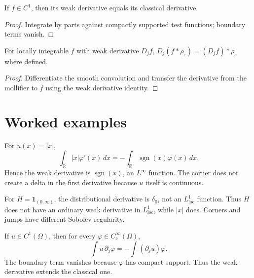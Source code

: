 \begin{theorem}\label{thm:iii20-02}
If $f\in C^1$, then its weak derivative equals its classical derivative.
\begin{proof}
Integrate by parts against compactly supported test functions; boundary terms vanish.
\end{proof}
\end{theorem}

\begin{theorem}\label{thm:iii20-03}
For locally integrable $f$ with weak derivative $D_jf$, $D_j(f*\rho_\varepsilon)=(D_jf)*\rho_\varepsilon$ where defined.
\begin{proof}
Differentiate the smooth convolution and transfer the derivative from the mollifier to $f$ using the weak derivative identity.
\end{proof}
\end{theorem}

\section{Worked examples}

\begin{example}\label{ex:iii20-worked-01}
For \(u(x)=|x|\),
\[
\int_{\mathbb R}|x|\varphi'(x)\,dx
=-\int_{\mathbb R}\operatorname{sgn}(x)\varphi(x)\,dx.
\]
Hence the weak derivative is \(\operatorname{sgn}(x)\), an \(L^\infty\)
function. The corner does not create a delta in the first derivative because
\(u\) itself is continuous.
\end{example}

\begin{example}\label{ex:iii20-worked-02}
For \(H=\mathbf1_{(0,\infty)}\), the distributional derivative is
\(\delta_0\), not an \(L^1_{\mathrm{loc}}\) function. Thus \(H\) does not have
an ordinary weak derivative in \(L^1_{\mathrm{loc}}\), while \(|x|\) does.
Corners and jumps have different Sobolev regularity.
\end{example}

\begin{example}\label{ex:iii20-worked-03}
If \(u\in C^1(\Omega)\), then for every
\(\varphi\in C_c^\infty(\Omega)\),
\[
\int u\,\partial_j\varphi
=-\int(\partial_ju)\varphi.
\]
The boundary term vanishes because \(\varphi\) has compact support. Thus the
weak derivative extends the classical one.
\end{example}

